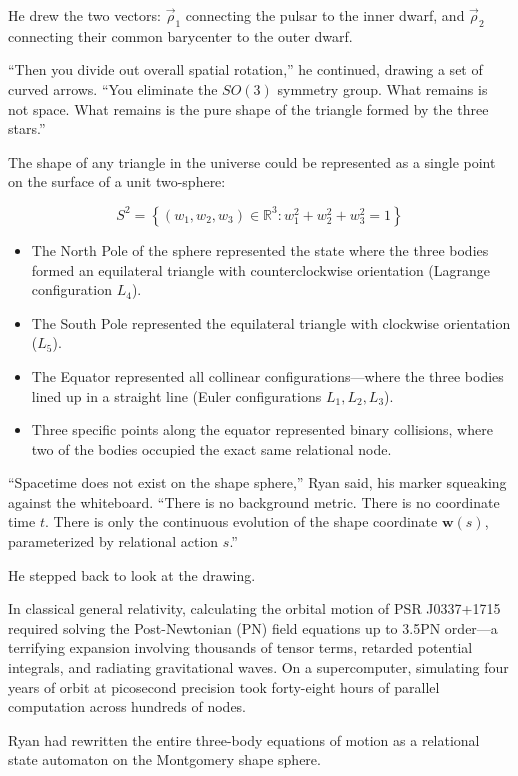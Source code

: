 \documentclass[12pt,twoside,openright]{book}
\providecommand{\tightlist}{\setlength{\itemsep}{0pt}\setlength{\parskip}{0pt}
\setlength{\tabcolsep}{2pt}}
\begin{document}
He drew the two vectors: \(\vec{\rho}_1\) connecting the pulsar to the
inner dwarf, and \(\vec{\rho}_2\) connecting their common barycenter to
the outer dwarf.

``Then you divide out overall spatial rotation,'' he continued, drawing
a set of curved arrows. ``You eliminate the \(SO(3)\) symmetry group.
What remains is not space. What remains is the pure shape of the
triangle formed by the three stars.''

The shape of any triangle in the universe could be represented as a
single point on the surface of a unit two-sphere:

\[S^2 = \left\{ (w_1, w_2, w_3) \in \mathbb{R}^3 : w_1^2 + w_2^2 + w_3^2 = 1 \right\}\]

\begin{itemize}
\tightlist
\item
  The North Pole of the sphere represented the state where the three
  bodies formed an equilateral triangle with counterclockwise
  orientation (Lagrange configuration \(L_4\)).
\item
  The South Pole represented the equilateral triangle with clockwise
  orientation (\(L_5\)).
\item
  The Equator represented all collinear configurations---where the three
  bodies lined up in a straight line (Euler configurations
  \(L_1, L_2, L_3\)).
\item
  Three specific points along the equator represented binary collisions,
  where two of the bodies occupied the exact same relational node.
\end{itemize}

``Spacetime does not exist on the shape sphere,'' Ryan said, his marker
squeaking against the whiteboard. ``There is no background metric. There
is no coordinate time \(t\). There is only the continuous evolution of
the shape coordinate \(\mathbf{w}(s)\), parameterized by relational
action \(s\).''

He stepped back to look at the drawing.

In classical general relativity, calculating the orbital motion of PSR
J0337+1715 required solving the Post-Newtonian (PN) field equations up
to 3.5PN order---a terrifying expansion involving thousands of tensor
terms, retarded potential integrals, and radiating gravitational waves.
On a supercomputer, simulating four years of orbit at picosecond
precision took forty-eight hours of parallel computation across hundreds
of nodes.

Ryan had rewritten the entire three-body equations of motion as a
relational state automaton on the Montgomery shape sphere.
\end{document}
